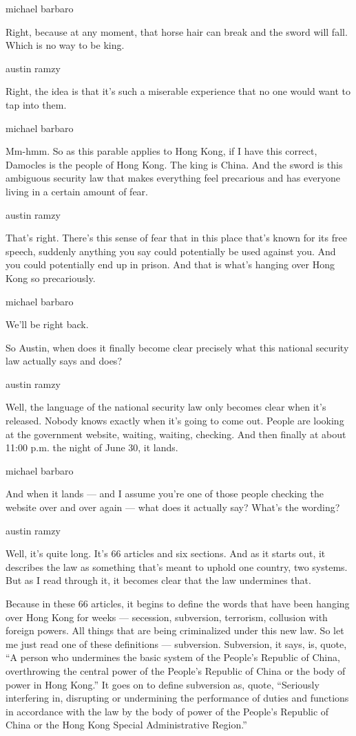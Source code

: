 michael barbaro

Right, because at any moment, that horse hair can break and the sword
will fall. Which is no way to be king.

austin ramzy

Right, the idea is that it's such a miserable experience that no one
would want to tap into them.

michael barbaro

Mm-hmm. So as this parable applies to Hong Kong, if I have this correct,
Damocles is the people of Hong Kong. The king is China. And the sword is
this ambiguous security law that makes everything feel precarious and
has everyone living in a certain amount of fear.

austin ramzy

That's right. There's this sense of fear that in this place that's known
for its free speech, suddenly anything you say could potentially be used
against you. And you could potentially end up in prison. And that is
what's hanging over Hong Kong so precariously.

michael barbaro

We'll be right back.

So Austin, when does it finally become clear precisely what this
national security law actually says and does?

austin ramzy

Well, the language of the national security law only becomes clear when
it's released. Nobody knows exactly when it's going to come out. People
are looking at the government website, waiting, waiting, checking. And
then finally at about 11:00 p.m. the night of June 30, it lands.

michael barbaro

And when it lands --- and I assume you're one of those people checking
the website over and over again --- what does it actually say? What's
the wording?

austin ramzy

Well, it's quite long. It's 66 articles and six sections. And as it
starts out, it describes the law as something that's meant to uphold one
country, two systems. But as I read through it, it becomes clear that
the law undermines that.

Because in these 66 articles, it begins to define the words that have
been hanging over Hong Kong for weeks --- secession, subversion,
terrorism, collusion with foreign powers. All things that are being
criminalized under this new law. So let me just read one of these
definitions --- subversion. Subversion, it says, is, quote, ``A person
who undermines the basic system of the People's Republic of China,
overthrowing the central power of the People's Republic of China or the
body of power in Hong Kong.'' It goes on to define subversion as, quote,
``Seriously interfering in, disrupting or undermining the performance of
duties and functions in accordance with the law by the body of power of
the People's Republic of China or the Hong Kong Special Administrative
Region.''

